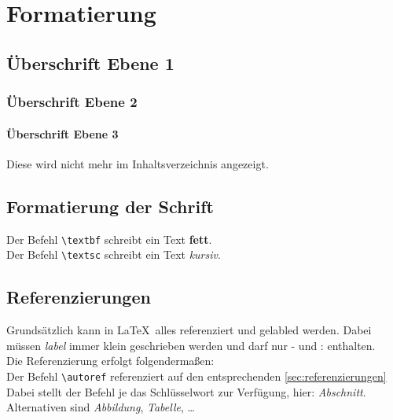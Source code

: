 
\chapter{Formatierung}

\section{Überschrift Ebene 1}

\subsection{Überschrift Ebene 2}

\subsubsection{Überschrift Ebene 3}
Diese wird nicht mehr im Inhaltsverzeichnis angezeigt.

\section{Formatierung der Schrift}
Der Befehl \verb|\textbf| schreibt ein Text \textbf{fett}.\\
Der Befehl \verb|\textsc| schreibt ein Text \textit{kursiv}.\\

\section{Referenzierungen}\label{sec:referenzierungen}
Grundsätzlich kann in \LaTeX~alles referenziert und gelabled werden.
Dabei müssen \textit{label} immer klein geschrieben werden und darf nur \glqq{}-\grqq{} und \glqq{}:\grqq{} enthalten.\\
Die Referenzierung erfolgt folgendermaßen:\\
Der Befehl \verb|\autoref| referenziert auf den entsprechenden \autoref{sec:referenzierungen}\\
Dabei stellt der Befehl je das Schlüsselwort zur Verfügung, hier: \textit{Abschnitt}.\\ Alternativen sind \textit{Abbildung}, \textit{Tabelle}, \dots


